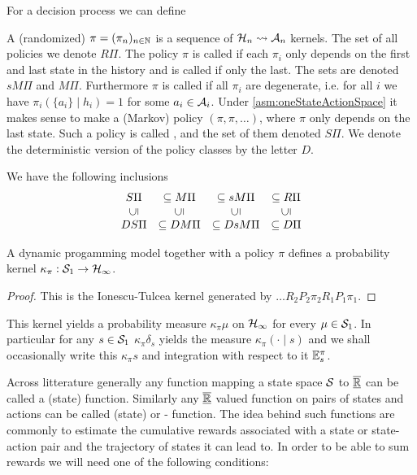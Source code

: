 For a decision process we can define
\begin{defn}[Policy]
  A (randomized)  $\pi = (\pi_n)_{n \in \mathbb{N}}$
  is a sequence of $\mathcal{H}_n \leadsto \mathcal{A}_n$ kernels.
  The set of all policies we denote $R\Pi$.
  The policy $\pi$ is called  if each $\pi_i$ only depends
  on the first and last state in the history
  and is called  if only the last.
  The sets are denoted $sM\Pi$ and $M\Pi$.
  Furthermore $\pi$ is called  if all $\pi_i$
  are degenerate, i.e. for all $i$ we have
  $\pi_i(\{a_i\} \mid h_i) = 1$ for some $a_i \in \mathcal{A}_{i}$.
  Under \cref{asm:oneStateActionSpace}
  it makes sense to make a (Markov) policy $(\pi, \pi, \dots)$,
  where $\pi$ only depends on the last state.
  Such a policy is called ,
  and the set of them denoted $S\Pi$.
  We denote the deterministic version of the policy classes
  by the letter $D$.
\end{defn}
We have the following inclusions
\[ \begin{matrix}
  S\Pi &\subseteq M\Pi &\subseteq sM\Pi &\subseteq R\Pi
  \\ \rleft{\subseteq} & \rleft{\subseteq} & \rleft{\subseteq} & \rleft{\subseteq} 
  \\ DS\Pi &\subseteq DM\Pi &\subseteq DsM\Pi &\subseteq D\Pi
\end{matrix} \] 

\begin{prop}
A dynamic progamming model together with a policy $\pi$ defines a
probability kernel $\kappa_\pi : \mathcal{S}_1 \to \mathcal{H}_\infty$.
\end{prop}
\begin{proof}
  This is the Ionescu-Tulcea kernel generated by
  $\dots R_2 P_2 \pi_2 R_1 P_1 \pi_1$.
\end{proof}
This kernel yields a probability measure $\kappa_\pi \mu$ on $\mathcal{H}_\infty$
for every $\mu \in \mathcal{S}_1$. In particular for any $s \in \mathcal{S}_1$
$\kappa_\pi \delta_s$ yields the measure $\kappa_\pi(\cdot \mid s)$
and we shall occasionally write this $\kappa_\pi s$ and
integration with respect to it $\mathbb{E}^\pi_s$.

Across litterature generally %
any function mapping a state space $\mathcal{S}$ to $\overline{\underline{\mathbb{R}}}$
can be called a (state)
 function. Similarly any $\underline{\overline{\mathbb{R}}}$ valued function
on pairs of states and actions can be called (state)
 or - function.
The idea behind such functions are commonly to estimate the
cumulative rewards associated with a state or state-action pair
and the trajectory of states it can lead to.
In order to be able to sum rewards
we will need one of
the following conditions:

